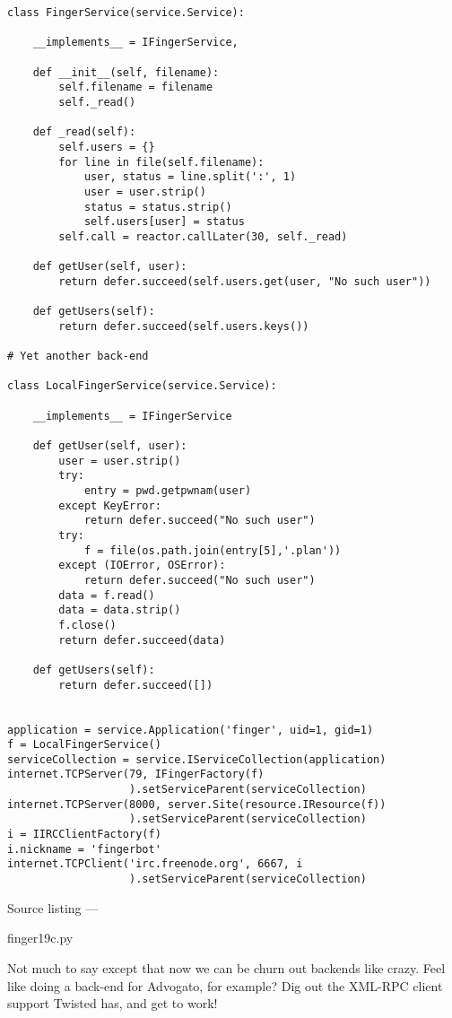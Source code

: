 \begin{verbatim}
class FingerService(service.Service):

    __implements__ = IFingerService,

    def __init__(self, filename):
        self.filename = filename
        self._read()

    def _read(self):
        self.users = {}
        for line in file(self.filename):
            user, status = line.split(':', 1)
            user = user.strip()
            status = status.strip()
            self.users[user] = status
        self.call = reactor.callLater(30, self._read)

    def getUser(self, user):
        return defer.succeed(self.users.get(user, "No such user"))

    def getUsers(self):
        return defer.succeed(self.users.keys())

# Yet another back-end

class LocalFingerService(service.Service):

    __implements__ = IFingerService

    def getUser(self, user):
        user = user.strip()
        try:
            entry = pwd.getpwnam(user)
        except KeyError:
            return defer.succeed("No such user")
        try:
            f = file(os.path.join(entry[5],'.plan'))
        except (IOError, OSError):
            return defer.succeed("No such user")
        data = f.read()
        data = data.strip()
        f.close()
        return defer.succeed(data)

    def getUsers(self):
        return defer.succeed([])


application = service.Application('finger', uid=1, gid=1)
f = LocalFingerService()
serviceCollection = service.IServiceCollection(application)
internet.TCPServer(79, IFingerFactory(f)
                   ).setServiceParent(serviceCollection)
internet.TCPServer(8000, server.Site(resource.IResource(f))
                   ).setServiceParent(serviceCollection)
i = IIRCClientFactory(f)
i.nickname = 'fingerbot'
internet.TCPClient('irc.freenode.org', 6667, i
                   ).setServiceParent(serviceCollection)
\end{verbatim}\parbox[b]{\linewidth}{\begin{center}Source listing --- \begin{em}finger19c.py\end{em}\end{center}}

Not much to say except that now we can be churn out backends like crazy. Feel like doing a back-end for Advogato, for example? Dig out the XML-RPC client support Twisted has, and get to work!